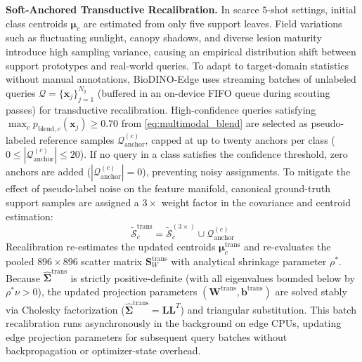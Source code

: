 \documentclass[conference]{IEEEtran}
\begin{document}
\medskip
\textbf{Soft-Anchored Transductive Recalibration.} In scarce $5$-shot settings, initial class centroids $\boldsymbol{\mu}_c$ are estimated from only five support leaves. Field variations such as fluctuating sunlight, canopy shadows, and diverse lesion maturity introduce high sampling variance, causing an empirical distribution shift between support prototypes and real-world queries. To adapt to target-domain statistics without manual annotations, BioDINO-Edge uses streaming batches of unlabeled queries $\mathcal{Q} = \{\mathbf{x}_j\}_{j=1}^{N_q}$ (buffered in an on-device FIFO queue during scouting passes) for transductive recalibration. High-confidence queries satisfying $\max_c p_{\text{blend}, c}(\mathbf{x}_j) \ge 0.70$ from \eqref{eq:multimodal_blend} are selected as pseudo-labeled reference samples $\mathcal{Q}_{\text{anchor}}^{(c)}$, capped at up to twenty anchors per class ($0 \le |\mathcal{Q}_{\text{anchor}}^{(c)}| \le 20$). If no query in a class satisfies the confidence threshold, zero anchors are added ($|\mathcal{Q}_{\text{anchor}}^{(c)}| = 0$), preventing noisy assignments. To mitigate the effect of pseudo-label noise on the feature manifold, canonical ground-truth support samples are assigned a $3\times$ weight factor in the covariance and centroid estimation:
\begin{equation}
    \tilde{\mathcal{S}}_c^{\text{trans}} = \tilde{\mathcal{S}}_c^{(3\times)} \cup \mathcal{Q}_{\text{anchor}}^{(c)}
\end{equation}
Recalibration re-estimates the updated centroids $\boldsymbol{\mu}_c^{\text{trans}}$ and re-evaluates the pooled $896 \times 896$ scatter matrix $\mathbf{S}_W^{\text{trans}}$ with analytical shrinkage parameter $\rho^*$. Because $\hat{\mathbf{\Sigma}}^{\text{trans}}$ is strictly positive-definite (with all eigenvalues bounded below by $\rho^* \nu > 0$), the updated projection parameters $(\mathbf{W}^{\text{trans}}, \mathbf{b}^{\text{trans}})$ are solved stably via Cholesky factorization ($\hat{\mathbf{\Sigma}}^{\text{trans}} = \mathbf{L}\mathbf{L}^T$) and triangular substitution. This batch recalibration runs asynchronously in the background on edge CPUs, updating edge projection parameters for subsequent query batches without backpropagation or optimizer-state overhead.
\end{document}
